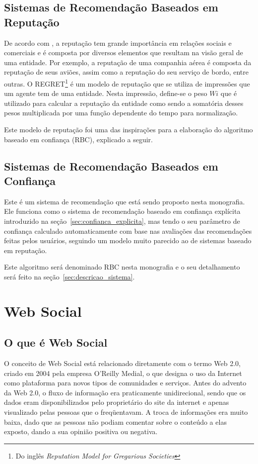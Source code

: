 \subsection{Sistemas de Recomendação Baseados em Reputação}
\label{sec:sistemas_de_recomendacao_baseados_em_reputacao}

De acordo com \cite{sabater2001regret}, a reputação tem grande importância em relações sociais e comerciais e é composta por diversos elementos que resultam na visão geral de uma entidade. Por exemplo, a reputação de uma companhia aérea é composta da reputação de seus aviões, assim como a reputação do seu serviço de bordo, entre outras. O REGRET\footnote{Do inglês \textit{Reputation Model for Gregarious Societies}\cite{sabater2001regret}} é um modelo de reputação que se utiliza de impressões que um agente tem de uma entidade. Nesta impressão, define-se o peso $W{i}$ que é utilizado para calcular a reputação da entidade como sendo a somatória desses pesos multiplicada por uma função dependente do tempo para normalização.

Este modelo de reputação foi uma das inspirações para a elaboração do algoritmo baseado em confiança (RBC), explicado a seguir.


\subsection{Sistemas de Recomendação Baseados em Confiança}

Este é um sistema de recomendação que está sendo proposto nesta monografia. Ele funciona como o sistema de recomendação baseado em confiança explícita introduzido na seção~\ref{sec:confianca_explicita}, mas tendo o seu parâmetro de confiança calculado automaticamente com base nas avaliações das recomendações feitas pelos usuários, seguindo um modelo muito parecido ao de sistemas baseado em reputação.

Este algoritmo será denominado RBC nesta monografia e o seu detalhamento será feito na seção~\ref{sec:descricao_sistema}.

\section{Web Social} %

\subsection{O que é Web Social}

O conceito de Web Social está relacionado diretamente com o termo Web 2.0, criado em 2004 pela empresa O'Reilly Medial, o que designa o uso da Internet como plataforma para novos tipos de comunidades e serviços. Antes do advento da Web 2.0, o fluxo de informação era praticamente unidirecional, sendo que os dados eram disponibilizados pelo proprietário do site da internet e apenas visualizado pelas pessoas que o freqüentavam. A troca de informações era muito baixa, dado que as pessoas não podiam comentar sobre o conteúdo a elas exposto, dando a sua opinião positiva ou negativa.

